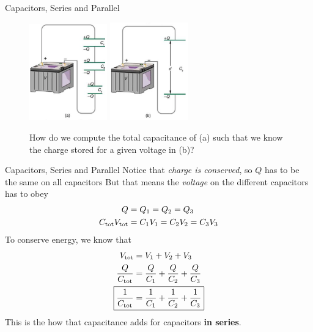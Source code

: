 \documentclass{beamer}
\begin{document}
\begin{frame}{Capacitors, Series and Parallel}
\begin{figure}
\centering
\includegraphics[width=0.3\textwidth]{figures/cap1.png} \hspace{0.2cm}
\includegraphics[width=0.3\textwidth]{figures/cap2.png}
\caption{\label{fig:cap} How do we compute the total capacitance of (a) such that we know the charge stored for a given voltage in (b)?}
\end{figure}
\end{frame}

\begin{frame}{Capacitors, Series and Parallel}
\small
Notice that \textit{charge is conserved}, so $Q$ has to be the same on all capacitors
But that means the \textit{voltage} on the different capacitors has to obey
\begin{align}
Q &= Q_1 = Q_2 = Q_3 \\
C_{\rm tot} V_{\rm tot} &= C_1 V_1 = C_2 V_2 = C_3 V_3
\end{align}
To conserve energy, we know that
\begin{align}
V_{\rm tot} &= V_1 + V_2 + V_3 \\
\frac{Q}{C_{\rm tot}} &= \frac{Q}{C_1} + \frac{Q}{C_2} + \frac{Q}{C_3} \\
\Aboxed{\frac{1}{C_{\rm tot}} &= \frac{1}{C_1} + \frac{1}{C_2} + \frac{1}{C_3}}
\end{align}
This is the how that capacitance adds for capacitors \textbf{in series}.
\end{frame}
\end{document}
